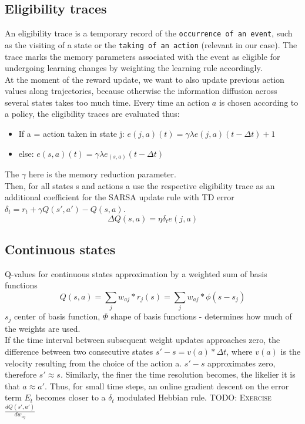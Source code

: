 \documentclass[11pt]{article}
\begin{document}
\subsection{Eligibility traces}
An eligibility trace is a temporary record of the \texttt{occurrence of an event}, such as the visiting of a state or the \texttt{taking of an action} (relevant in our case). The trace marks the memory parameters associated with the event as eligible for undergoing learning changes by weighting the learning rule accordingly.\\ 
At the moment of the reward update, we want to also update previous action values along trajectories, because otherwise the information diffusion across several states takes too much time.
Every time an action $a$ is chosen according to a policy, the eligibility traces are evaluated thus: 
\begin{itemize}
	\item If a = action taken in state j: $e(j,a)(t) = \gamma\lambda e(j,a)(t-\Delta t) + 1$
	\item else: $e(s,a)(t) = \gamma \lambda e_(s,a)(t-\Delta t)$ 
\end{itemize}
The $\gamma$ here is the memory reduction parameter.\\
Then, for all states s and actions a use the respective eligibility trace as an additional coefficient for the SARSA update rule with TD error $\delta_t=r_{t}+\gamma Q(s',a')-Q(s,a)$.
\[
	\Delta Q(s,a) = \eta \delta_t e(j,a)
\]

\subsection{Continuous states}
Q-values for continuous states approximation by a weighted sum of basis functions
\[
	Q(s,a) = \sum_j w_{aj}*r_j(s) = \sum_j w_{aj}*\phi(s-s_j)
\]
$s_j$ center of basis function, $\Phi$ shape of basis functions - determines how much of the weights are used.\\
If the time interval between subsequent weight updates approaches zero, the difference between two consecutive states $s' - s = v(a) * \Delta t$, where $v(a)$ is the velocity resulting from the choice of the action a. $s'-s$ approximates zero, therefore $s' \approx s$. Similarly, the finer the time resolution becomes, the likelier it is that $a \approx a'$. Thus, for small time steps, an online gradient descent on the error term $E_t$ becomes closer to a $\delta_t$ modulated Hebbian rule. 
\textsc{TODO: Exercise} $\frac{dQ(s',a')}{dw_{aj}}$
\end{document}
